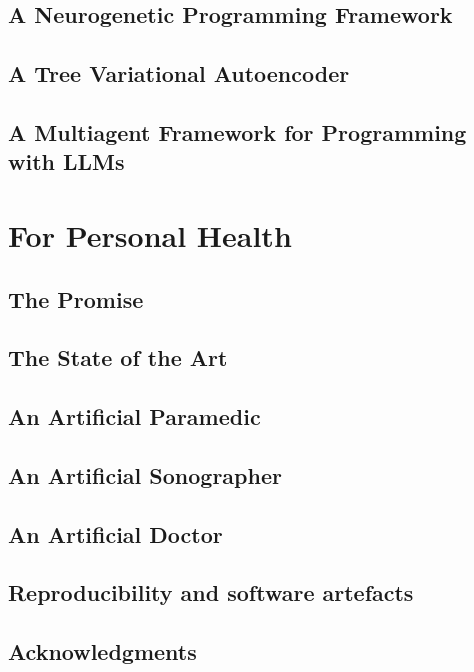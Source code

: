 \newpage
\chapter{A Neurogenetic Programming Framework}\label{ch:neurogen}


\newpage
\chapter{A Tree Variational Autoencoder}\label{ch:tree2tree}


\newpage
\chapter{A Multiagent Framework for Programming with LLMs}\label{ch:seidr}


\part{For Personal Health}
\newpage
\chapter{The Promise} \label{ch:health-motiv}


\newpage
\chapter{The State of the Art} \label{ch:health-sota}


\newpage
\chapter{An Artificial Paramedic} \label{ch:virtu-als}



\newpage
\chapter{An Artificial Sonographer} \label{ch:imagym}


\newpage
\chapter{An Artificial Doctor} \label{ch:mimicseq}


\newpage
\chapter{Reproducibility and software artefacts}





\newpage
\chapter{Acknowledgments}



\printbibliography


